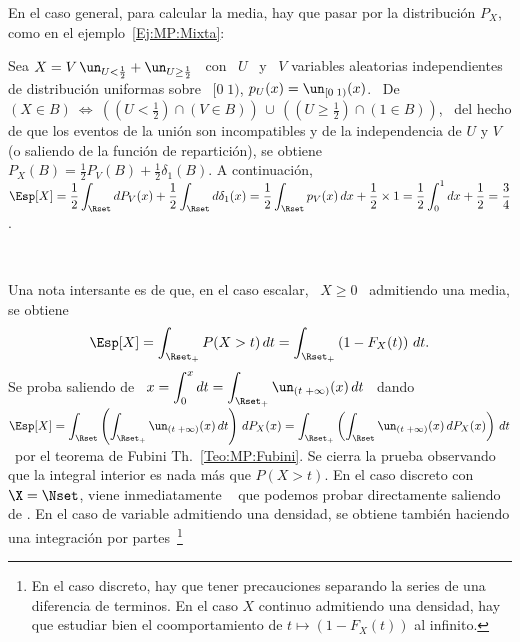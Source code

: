 En el caso general, para calcular  la media, hay que pasar por la distribuci\'on
$P_X$, como en el ejemplo~\ref{Ej:MP:Mixta}:
%
\begin{ejemplo}
\label{Ej:MP:EspMixta}
%
Sea $X =  V \, \un_{U <  \frac12} + \un_{U \ge \frac12}$  \ con \ $U$ \  y \ $V$
variables aleatorias  independientes de distribuci\'on uniformas sobre  \ $[0 \;
1)$, \ie  $p_U(x) = \un_{[0 \;  1)}(x)$. \ De \  $(X \in B)  \: \Leftrightarrow \:
\left( \left( U < \frac12 \right) \cap \left( V \in B \right) \right) \, \cup \,
\left( \left( U \ge \frac12 \right) \cap  \left( 1 \in B \right) \right)$, \ del
hecho de que  los eventos de la uni\'on son incompatibles  y de la independencia
de $U$ y $V$ (o saliendo de la funci\'on de repartici\'on), se obtiene $P_X(B) =
\frac12  P_V(B)  + \frac12  \delta_1(B)$.   A  continuaci\'on, \  $\displaystyle
\Esp[X] = \frac12 \int_\Rset dP_V(x) + \frac12 \int_\Rset d\delta_1(x) = \frac12
\int_\Rset p_V(x)  \, dx + \frac12  \times 1 =  \frac12 \int_0^1 dx +  \frac12 =
\frac34$.
\end{ejemplo}

\

Una nota intersante  es de que, en el  caso escalar,  \ $X  \ge 0$ \
admitiendo una media, se obtiene
%
\[
\Esp[X]  = \int_{\Rset_+} P(X  > t)  \, dt  = \int_{\Rset_+}  \left( 1  - F_X(t)
\right) \, dt.
\]
%
Se proba saliendo  de \ $\displaystyle x = \int_0^x  dt = \int_{\Rset_+} \un_{(t
  \; +\infty)}(x)  \, dt$ \ dando  \ $\displaystyle \Esp[X]  = \int_\Rset \left(
  \int_{\Rset_+}   \un_{(t  \;  +\infty)}(x)   \,  dt   \right)  \,   dP_X(x)  =
\int_{\Rset_+} \left(  \int_\Rset \un_{(t \; +\infty)}(x) \,  dP_X(x) \right) \,
dt$ \ por el teorema de Fubini Th.~\ref{Teo:MP:Fubini}.
Se cierra la prueba observando que la integral interior es nada m\'as que $P(X >
t)$.   En   el  caso  discreto  con   $\X  =  \Nset$,   viene  inmediatamente  \
  que  podemos  probar
directamente saliendo de \modif{$P(X = t) = P(X  > t) - P(X > t-1)$}. En el caso
de variable  admitiendo una densidad,  se \modif{lo} obtiene  tambi\'en haciendo
una  integraci\'on  por partes~\footnote{En  el  caso  discreto,  hay que  tener
  precauciones separando la series de una diferencia de terminos. En el caso $X$
  continuo admitiendo una densidad, hay  que estudiar bien el coomportamiento de
  $t \mapsto (1-F_X(t))$ al infinito.}

